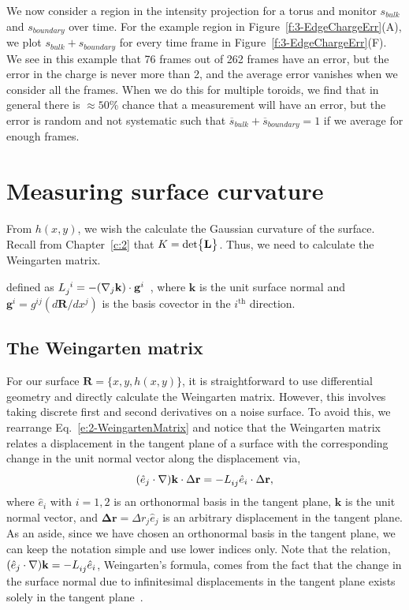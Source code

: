 We now consider a region in the intensity projection for a torus and monitor  $s_{bulk}$ and $s_{boundary}$ over time.
For the example region in Figure~\ref{f:3-EdgeChargeErr}(A), we plot $s_{bulk}+s_{boundary}$ for every time frame in Figure~\ref{f:3-EdgeChargeErr}(F).
We see in this example that 76 frames out of 262 frames have an error, but the error in the charge is never more than 2, and the average error vanishes when we consider all the frames.
When we do this for multiple toroids, we find that in general there is $\approx 50$\% chance that a measurement will have an error, but the error is random and not systematic such that $\overbar{s}_{bulk} + \overbar{s}_{boundary} = 1$ if we average for enough frames.




\section{Measuring surface curvature}
From $h(x,y)$, we wish the calculate the Gaussian curvature of the surface.
Recall from Chapter~\ref{c:2} that $K = \textup{det} \big \{ \mathbf{L} \big \}$.
Thus, we need to calculate the Weingarten matrix.


 defined as $\tensor{L}{_j^i} = -(\nabla_j \mathbf{k}) \cdot \mathbf{g}^i$~\cite{RN35}, where $\mathbf{k}$ is the unit surface normal and $\mathbf{g}^i = g^{ij}(d \mathbf{R}/dx^j)$ is the basis covector in the $i^{\textrm{th}}$ direction.



\subsection{The Weingarten matrix}
For our surface $\mathbf{R} = \{x, y, h(x,y)\}$, it is straightforward to use differential geometry and directly calculate the Weingarten matrix.
However, this involves taking discrete first and second derivatives on a noise surface.
To avoid this, we rearrange Eq.~\ref{e:2-WeingartenMatrix} and notice that the Weingarten matrix relates a displacement in the tangent plane of a surface with the corresponding change in the unit normal vector along the displacement via,
\begin{equation}
(\hat{e}_j \cdot \nabla) \mathbf{k} \cdot \Delta \mathbf{r} = -\tensor{L}{_{ij}} \hat{e}_i \cdot \Delta \mathbf{r},\label{e:3-Kfit1}
\end{equation}
where $\hat{e}_i$ with $i = 1,2$ is an orthonormal basis in the tangent plane, $\mathbf{k}$ is the unit normal vector, and  $\mathbf{\Delta r} = \Delta r_j \hat{e}_j$ is an arbitrary displacement in the tangent plane.
As an aside, since we have chosen an orthonormal basis in the tangent plane, we can keep the notation simple and use lower indices only.
Note that the relation, $(\hat{e}_j \cdot \nabla) \mathbf{k} = -\tensor{L}{_{ij}} \hat{e}_i$, Weingarten's formula, comes from the fact that the change in the surface normal due to infinitesimal displacements in the tangent plane exists solely in the tangent plane~\cite{RN35}.


